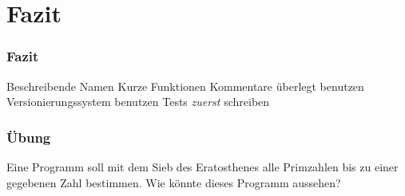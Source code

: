 \documentclass[handout]{beamer}
\begin{document}
\section{Fazit}
\begin{frame}
    \begin{tikzpicture}[overlay,
        shift={(current page.south west)},
        x = \paperwidth,
        y = \paperheight,
    ]
\end{tikzpicture}
    \frametitle{Fazit}
    \begin{outline}
        \1 Beschreibende Namen
        \1 Kurze Funktionen
        \1 Kommentare überlegt benutzen
        \1 Versionierungssystem benutzen
        \1 Tests \emph{zuerst} schreiben
    \end{outline}
    \pause
\end{frame}

\begin{frame}
    \frametitle{Übung}
    Eine Programm soll mit dem Sieb des Eratosthenes alle Primzahlen bis zu
    einer gegebenen Zahl bestimmen. Wie könnte dieses Programm aussehen?
\end{frame}
\end{document}
